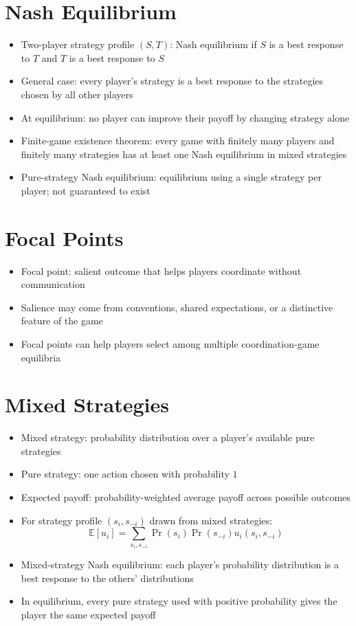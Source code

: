 \section{Nash Equilibrium}
\begin{itemize}
    \item Two-player strategy profile $(S,T)$: Nash equilibrium if $S$ is a best response to $T$ and $T$ is a best response to $S$
    \item General case: every player's strategy is a best response to the strategies chosen by all other players
    \item At equilibrium: no player can improve their payoff by changing strategy alone
    \item Finite-game existence theorem: every game with finitely many players and finitely many strategies has at least one Nash equilibrium in mixed strategies
    \item Pure-strategy Nash equilibrium: equilibrium using a single strategy per player; not guaranteed to exist
\end{itemize}

\section{Focal Points}
\begin{itemize}
    \item Focal point: salient outcome that helps players coordinate without communication
    \item Salience may come from conventions, shared expectations, or a distinctive feature of the game
    \item Focal points can help players select among multiple coordination-game equilibria
\end{itemize}

\section{Mixed Strategies}
\begin{itemize}
    \item Mixed strategy: probability distribution over a player's available pure strategies
    \item Pure strategy: one action chosen with probability $1$
    \item Expected payoff: probability-weighted average payoff across possible outcomes
    \item For strategy profile $(s_i,s_{-i})$ drawn from mixed strategies:
          \[
              \mathbb{E}[u_i] = \sum_{s_i,s_{-i}} \Pr(s_i)\Pr(s_{-i})u_i(s_i,s_{-i})
          \]
    \item Mixed-strategy Nash equilibrium: each player's probability distribution is a best response to the others' distributions
    \item In equilibrium, every pure strategy used with positive probability gives the player the same expected payoff
\end{itemize}

